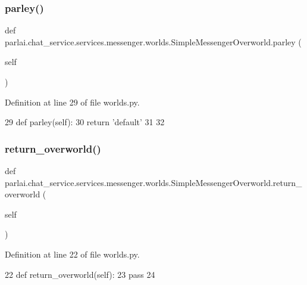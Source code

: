 \subsubsection{\texorpdfstring{parley()}{parley()}}
{\footnotesize\ttfamily def parlai.\+chat\+\_\+service.\+services.\+messenger.\+worlds.\+Simple\+Messenger\+Overworld.\+parley (\begin{DoxyParamCaption}\item[{}]{self }\end{DoxyParamCaption})}



Definition at line 29 of file worlds.\+py.


\begin{DoxyCode}
29     \textcolor{keyword}{def }parley(self):
30         \textcolor{keywordflow}{return} \textcolor{stringliteral}{'default'}
31 
32 
\end{DoxyCode}
\mbox{\label{classparlai_1_1chat__service_1_1services_1_1messenger_1_1worlds_1_1SimpleMessengerOverworld_a69d3f1ced23ef51fae88d92ed5ea085b}} 
\subsubsection{\texorpdfstring{return\+\_\+overworld()}{return\_overworld()}}
{\footnotesize\ttfamily def parlai.\+chat\+\_\+service.\+services.\+messenger.\+worlds.\+Simple\+Messenger\+Overworld.\+return\+\_\+overworld (\begin{DoxyParamCaption}\item[{}]{self }\end{DoxyParamCaption})}



Definition at line 22 of file worlds.\+py.


\begin{DoxyCode}
22     \textcolor{keyword}{def }return\_overworld(self):
23         \textcolor{keywordflow}{pass}
24 
\end{DoxyCode}


